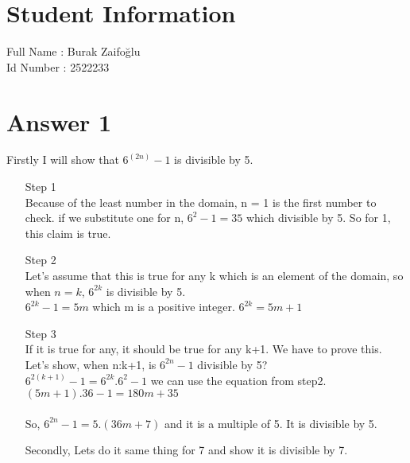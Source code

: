 \documentclass[12pt]{article}
\begin{document}
\section*{Student Information }
Full Name :  Burak Zaifoğlu\\
Id Number :  2522233\\

\section*{Answer 1}
Firstly I will show that $6^{(2n)}-1$ is divisible by 5.\\

\begin{enumerate}
    \item[Step 1]\\
    Because of the least number in the domain, n = 1 is the first number to check. if we substitute one for n, $6^2-1 = 35$ which divisible by 5. So for 1, this claim is true.
    \item[Step 2]\\
    Let's assume that this is true for any k which is an element of the domain, so when $n=k$, $6^{2k}$ is divisible by 5.\\ 
    $6^{2k} - 1 = 5m$ which m is a positive integer. $6^{2k} = 5m + 1$
    \item[Step 3]\\
    If it is true for any, it should be true for any k+1. We have to prove this. Let's show, when n:k+1, is $6^{2n}-1$ divisible by 5?\\
    $6^{2(k+1)}-1 = 6^{2k}.6^2 - 1$ we can use the equation from step2. \\
    $(5m+1).36-1 = 180m+35$\\
    \\
    So, $6^{2n}-1 = 5.(36m+7)$ and it is a multiple of 5. It is divisible by 5.

    Secondly, Lets do it same thing for 7 and show it is divisible by 7.\\


\end{enumerate}
\end{document}
